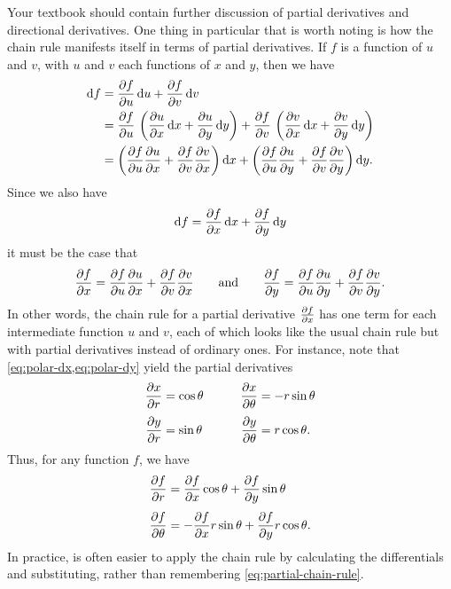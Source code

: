 \documentclass[12pt]{amsart}
\begin{document}
Your textbook should contain further discussion of partial derivatives and directional derivatives.
One thing in particular that is worth noting is how the chain rule manifests itself in terms of partial derivatives.
If $f$ is a function of $u$ and $v$, with $u$ and $v$ each functions of $x$ and $y$, then we have
\begin{align*}
  \mathrm{d} f &= \frac{\partial f}{\partial u}\,\mathrm{d} u + \frac{\partial f}{\partial v}\,\mathrm{d} v\\
  &= \frac{\partial f}{\partial u}\,\left(\frac{\partial u}{\partial x}\,\mathrm{d} x + \frac{\partial u}{\partial y}\,\mathrm{d} y\right) + \frac{\partial f}{\partial v}\,\left(\frac{\partial v}{\partial x}\,\mathrm{d} x + \frac{\partial v}{\partial y}\,\mathrm{d} y\right)\\
  &= \left(\frac{\partial f}{\partial u}\frac{\partial u}{\partial x}+ \frac{\partial f}{\partial v}\frac{\partial v}{\partial x}\right)\mathrm{d} x + \left(\frac{\partial f}{\partial u}\frac{\partial u}{\partial y}+ \frac{\partial f}{\partial v}\frac{\partial v}{\partial y}\right)\mathrm{d} y.
\end{align*}
Since we also have
\[ \mathrm{d} f = \frac{\partial f}{\partial x}\,\mathrm{d} x + \frac{\partial f}{\partial y}\,\mathrm{d} y \]
it must be the case that
\begin{equation}\label{eq:partial-chain-rule}
  \frac{\partial f}{\partial x} = \frac{\partial f}{\partial u}\frac{\partial u}{\partial x}+ \frac{\partial f}{\partial v}\frac{\partial v}{\partial x}
  \qquad\text{and}\qquad
  \frac{\partial f}{\partial y} = \frac{\partial f}{\partial u}\frac{\partial u}{\partial y}+ \frac{\partial f}{\partial v}\frac{\partial v}{\partial y}.
\end{equation}
In other words, the chain rule for a partial derivative $\frac{\partial f}{\partial x}$ has one term for each intermediate function $u$ and $v$, each of which looks like the usual chain rule but with partial derivatives instead of ordinary ones.
For instance, note that \cref{eq:polar-dx,eq:polar-dy} yield the partial derivatives
\begin{alignat*}{2}
  \frac{\partial x}{\partial r} &= \cos\theta &\qquad
  \frac{\partial x}{\partial \theta} &= -r\sin\theta\\[3pt]
  \frac{\partial y}{\partial r} &= \sin\theta &\quad
  \frac{\partial y}{\partial \theta} &= r\cos\theta.
\end{alignat*}
Thus, for any function $f$, we have
\begin{align*}
  \pder{f}{r} %
  &= \pder{f}{x} \cos\theta + \pder{f}{y} \sin\theta\\[3pt]
  \pder{f}{\theta} %
  &= -\pder{f}{x} r\sin\theta + \pder{f}{y} r \cos \theta.
\end{align*}
In practice, is often easier to apply the chain rule by calculating the differentials and substituting, rather than remembering \cref{eq:partial-chain-rule}.
\end{document}

